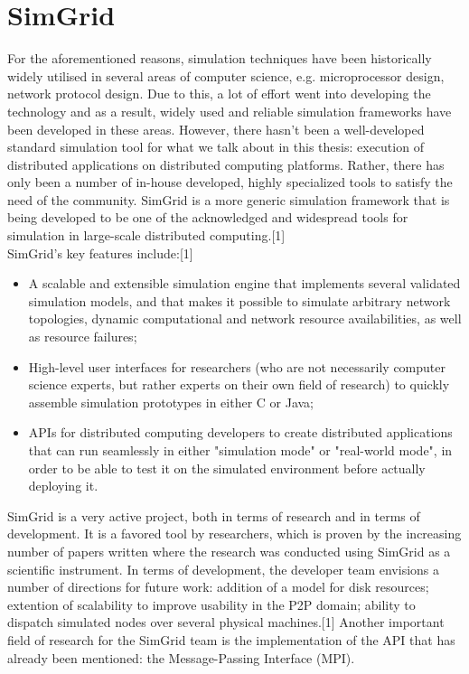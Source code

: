 \section{SimGrid}
For the aforementioned reasons, simulation techniques have been
historically widely utilised in several areas of computer science,
e.g. microprocessor design, network protocol design. Due to this, a
lot of effort went into developing the technology and as a result,
widely used and reliable simulation frameworks have been developed in
these areas. However, there hasn't been a well-developed standard
simulation tool for what we talk about in this thesis: execution of
distributed applications on distributed computing platforms. Rather,
there has only been a number of in-house developed, highly specialized
tools to satisfy the need of the community. SimGrid is a more generic
simulation framework that is being developed to be one of the
acknowledged and widespread tools for simulation in large-scale
distributed computing.[1]\\
SimGrid's key features include:[1]
\begin{itemize}
\item A scalable and extensible simulation engine that implements
  several validated simulation models, and that makes it possible to
  simulate arbitrary network topologies, dynamic computational and
  network resource availabilities, as well as resource failures;
\item High-level user interfaces for researchers (who are not
  necessarily computer science experts, but rather experts on their own
  field of research) to quickly assemble simulation prototypes in either
  C or Java;
\item APIs for distributed computing developers to create distributed
  applications that can run seamlessly in either "simulation mode" or
  "real-world mode", in order to be able to test it on the simulated
  environment before actually deploying it.
\end{itemize}
SimGrid is a very active project, both in terms of research and in
terms of development. It is a favored tool by researchers, which is
proven by the increasing number of papers written where the research
was conducted using SimGrid as a scientific instrument. In terms of
development, the developer team envisions a number of directions for
future work: addition of a model for disk resources; extention of
scalability to improve usability in the P2P domain; ability to
dispatch simulated nodes over several physical machines.[1] Another
important field of research for the SimGrid team is the implementation
of the API that has already been mentioned: the Message-Passing
Interface (MPI).
